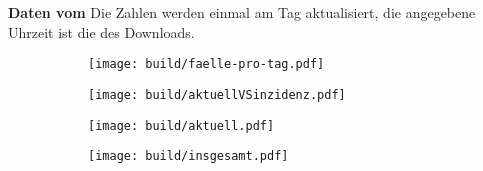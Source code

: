\documentclass[german]{scrartcl}
\begin{document}
  \thispagestyle{empty}
  \begin{landscape}
    \textbf{\Large Daten vom \DTMnow}
    \hfill
    {\tiny
      Die Zahlen werden einmal am Tag aktualisiert,
      die angegebene Uhrzeit ist die des Downloads.
    }
    \begin{figure}
      \centering
      \begin{subfigure}{.665\textwidth}
        \texttt{[image: build/faelle-pro-tag.pdf]}
      \end{subfigure}
      \hfill
      \begin{subfigure}{.665\textwidth}
        \texttt{[image: build/aktuellVSinzidenz.pdf]}
      \end{subfigure}
    \end{figure}
    \begin{figure}
        \centering
      \begin{subfigure}{.665\textwidth}
        \texttt{[image: build/aktuell.pdf]}
      \end{subfigure}
      \hfill
      \begin{subfigure}{.665\textwidth}
        \texttt{[image: build/insgesamt.pdf]}
      \end{subfigure}
    \end{figure}
  \end{landscape}
\end{document}
